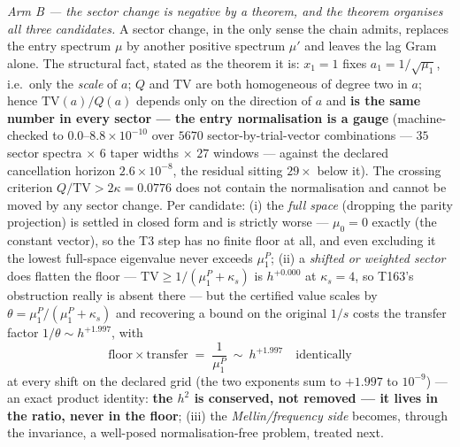 \documentclass[11pt,a4paper]{article}
\begin{document}
\emph{Arm B --- the sector change is negative by a theorem, and the theorem
organises all three candidates.} A sector change, in the only sense the chain
admits, replaces the entry spectrum $\mu$ by another positive spectrum $\mu'$
and leaves the lag Gram alone. The structural fact, stated as the theorem it
is: $x_1=1$ fixes $a_1=1/\sqrt{\mu_1}$, i.e.\ only the \emph{scale} of $a$;
$Q$ and TV are both homogeneous of degree two in $a$; hence
$\mathrm{TV}(a)/Q(a)$ depends only on the direction of $a$ and \textbf{is the
same number in every sector --- the entry normalisation is a gauge}
(machine-checked to $0.0$--$8.8\times10^{-10}$ over $5670$
sector-by-trial-vector combinations --- $35$ sector spectra $\times$ $6$ taper
widths $\times$ $27$ windows --- against the declared cancellation horizon
$2.6\times10^{-8}$, the residual sitting $29\times$ below it). The crossing
criterion $Q/\mathrm{TV}>2\kappa=0.0776$ does not contain the normalisation
and cannot be moved by any sector change. Per candidate: (i) the \emph{full
space} (dropping the parity projection) is settled in closed form and is
strictly worse --- $\mu_0=0$ exactly (the constant vector), so the T3 step has
no finite floor at all, and even excluding it the lowest full-space eigenvalue
never exceeds $\mu^P_1$; (ii) a \emph{shifted or weighted sector} does flatten
the floor --- $\mathrm{TV}\ge1/(\mu^P_1+\kappa_s)$ is $h^{+0.000}$ at
$\kappa_s=4$, so T163's obstruction really is absent there --- but the
certified value scales by $\theta=\mu^P_1/(\mu^P_1+\kappa_s)$ and recovering a
bound on the original $1/s$ costs the transfer factor $1/\theta\sim
h^{+1.997}$, with
\[
\text{floor}\times\text{transfer}\;=\;\frac1{\mu^P_1}\ \sim\ h^{+1.997}
\quad\text{identically}
\]
at every shift on the declared grid (the two exponents sum to $+1.997$ to
$10^{-9}$) --- an exact product identity: \textbf{the $h^2$ is conserved, not
removed --- it lives in the ratio, never in the floor}; (iii) the \emph{Mellin/frequency
side} becomes, through the invariance, a well-posed normalisation-free
problem, treated next.
\end{document}
